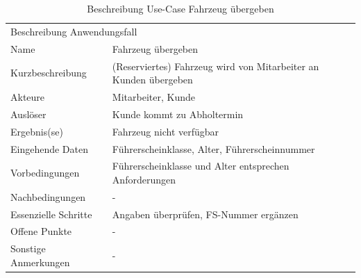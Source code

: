 \documentclass{scrartcl}
\begin{document}
\begin{table}[h]
\begin{tabular}{l | l}
\multicolumn{2}{l}{Beschreibung Anwendungsfall}                                         \\
Name                 & Fahrzeug übergeben                                               \\
Kurzbeschreibung     & (Reserviertes) Fahrzeug wird von Mitarbeiter an Kunden übergeben \\
Akteure              & Mitarbeiter, Kunde                                               \\
Auslöser             & Kunde kommt zu Abholtermin                                       \\
Ergebnis(se)         &  Fahrzeug nicht verfügbar                                                                \\
Eingehende Daten     & Führerscheinklasse, Alter, Führerscheinnummer                    \\
Vorbedingungen       & Führerscheinklasse und Alter entsprechen Anforderungen           \\
Nachbedingungen      &   -                                                               \\
Essenzielle Schritte & Angaben überprüfen, FS-Nummer ergänzen                           \\
Offene Punkte        &  -                                                                \\
Sonstige Anmerkungen & -                                                                
\end{tabular}

\caption{Beschreibung Use-Case Fahrzeug übergeben}
\end{table}
\end{document}
